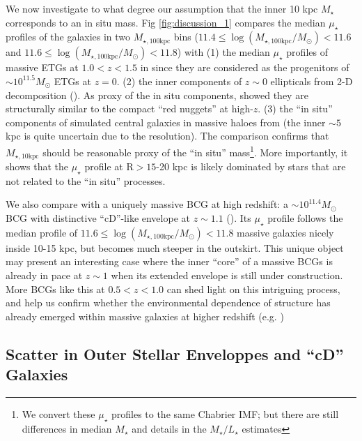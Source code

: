 \documentclass[a4paper,fleqn,usenatbib]{mnras}
\def\mstar{{$M_{\star}$}}
\def\minn{{$M_{\star,10\mathrm{kpc}}$}}
\def\mtot{{$M_{\star,100\mathrm{kpc}}$}}
\def\logmtot{{$\log (M_{\star,100\mathrm{kpc}}/M_{\odot})$}}
\def\m2l{{$M_{\star}/L_{\star}$}}
\def\mden{{$\mu_{\star}$}}
\begin{document}
    We now investigate to what degree our assumption that the inner 10 kpc \mstar{}
    corresponds to an in situ mass.    
    Fig \ref{fig:discussion_1} compares the median \mden{} profiles of the 
    galaxies in two \mtot{} bins 
    ($11.4\leq$\logmtot{}$<11.6$ and $11.6\leq$\logmtot{}$<11.8$) with 
    (1) the median \mden{} profiles of massive ETGs at $1.0 < z < 1.5$ in
    \citealt{Patel2013} since they are considered as the progenitors of 
    ${\sim} 10^{11.5} M_{\odot}$ ETGs at $z=0$.    
    (2) the inner components of $z{\sim} 0$ ellipticals from 2-D decomposition 
    (\citealt{Huang2013a}).
    As proxy of the in situ components, \citet{Huang2013b} showed they are 
    structurally similar to the compact ``red nuggets'' at high-$z$. 
    (3) the ``in situ'' components of simulated central galaxies in massive haloes 
    from \citet{Cooper13} (the inner ${\sim} 5$ kpc is quite uncertain due to the 
    resolution).  
    The comparison confirms that \minn{} should be reasonable proxy of the 
    ``in situ'' mass\footnote{We convert these \mden{} profiles to the same 
    Chabrier IMF; but there are still differences in median \mstar{} and 
    details in the \m2l{} estimates}.  
    More importantly, it shows that the \mden{} profile at 
    $\mathrm{R} > 15$-20 kpc is likely dominated by stars that are not related 
    to the ``in situ'' processes.  
    
    We also compare with a uniquely massive BCG at high redshift: 
    a ${\sim} 10^{11.4} M_{\odot}$ BCG with distinctive ``cD''-like envelope at 
    $z{\sim} 1.1$ (\citealt{Liu2013}).  
    Its \mden{} profile follows the median profile of $11.6\leq$\logmtot{}$<11.8$ 
    massive galaxies nicely inside 10-15 kpc, but becomes much steeper in the outskirt.  
    This unique object may present an interesting case where the inner ``core'' of a 
    massive BCGs is already in pace at $z{\sim} 1$ when its extended envelope is still
    under construction.
    More BCGs like this at $0.5 < z < 1.0$ can shed light on this intriguing 
    process, and help us confirm whether the environmental dependence of structure 
    has already emerged within massive galaxies at higher redshift 
    (e.g. \citealt{Papovich2012})

    
\subsection{Scatter in Outer Stellar Enveloppes and ``cD'' Galaxies}
        
\end{document}
